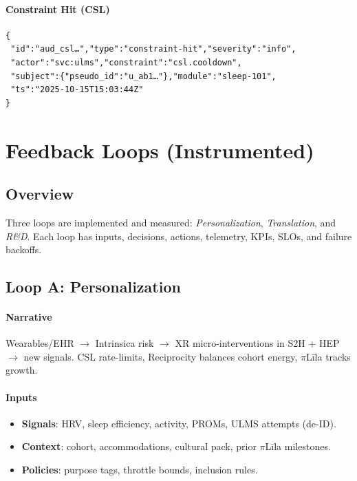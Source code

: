 \documentclass[11pt]{article}
\theoremstyle{plain}
\begin{document}
\paragraph{Constraint Hit (CSL)}
\begin{verbatim}
{
 "id":"aud_csl…","type":"constraint-hit","severity":"info",
 "actor":"svc:ulms","constraint":"csl.cooldown",
 "subject":{"pseudo_id":"u_ab1…"},"module":"sleep-101",
 "ts":"2025-10-15T15:03:44Z"
}
\end{verbatim}

\section{Feedback Loops (Instrumented)}

\subsection{Overview}
Three loops are implemented and measured: \emph{Personalization}, \emph{Translation}, and \emph{R\&D}. Each loop has inputs, decisions, actions, telemetry, KPIs, SLOs, and failure backoffs.

\subsection{Loop A: Personalization}\label{sec:loop-personalization}

\paragraph{Narrative}
Wearables/EHR $\rightarrow$ Intrinsica risk $\rightarrow$ XR micro-interventions in S2H + HEP $\rightarrow$ new signals. CSL rate-limits, Reciprocity balances cohort energy, $\pi$Līla tracks growth.

\paragraph{Inputs}
\begin{itemize}
  \item \textbf{Signals}: HRV, sleep efficiency, activity, PROMs, ULMS attempts (de-ID).
  \item \textbf{Context}: cohort, accommodations, cultural pack, prior $\pi$Līla milestones.
  \item \textbf{Policies}: purpose tags, throttle bounds, inclusion rules.
\end{itemize}
\end{document}
